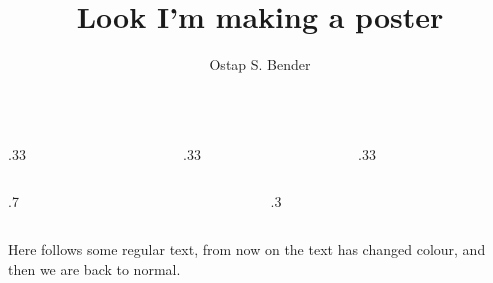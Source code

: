 \documentclass[xcolor={svgnames}]{beamer}
\title{Look I'm making a poster}
\author{Ostap S. Bender}
\institute{RUDN University}
\begin{document}
\begin{frame}
\begin{columns}
	\begin{column}{.33\textwidth}
	\lipsum[1]
	\end{column}
	\begin{column}{.33\textwidth}
	\lipsum[1]
	\end{column}
	\begin{column}{.33\textwidth}
	\lipsum[1]
	\end{column}
\end{columns}
%
\begin{columns}
	\begin{column}{.7\textwidth}
	\lipsum[1]
	\end{column}
	\begin{column}{.3\textwidth}
	\lipsum[1]
	\end{column}
\end{columns}

Here follows some regular text, \color{BlueViolet} from now on the text has changed colour, \color{Black} and then we are back to normal.

\end{frame}
\end{document}
